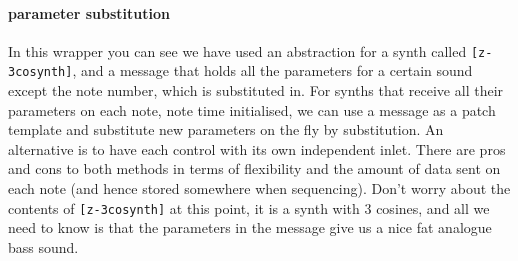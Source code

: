 \paragraph{parameter substitution}
In this wrapper you can see we have used an abstraction for a synth called
\verb+[z-3cosynth]+, and a message that holds all the parameters
for a certain sound except the note number, which is substituted in.
For synths that receive all their parameters on each note, note time
initialised, we can use a message as a patch template and 
substitute new parameters on the fly by substitution. An alternative is to
have each control with its own independent inlet. There are pros and cons 
to both methods in terms of flexibility and the amount of data sent
on each note (and hence stored somewhere when sequencing). Don't worry
about the contents of \verb+[z-3cosynth]+ at this point, it is a
synth with 3 cosines, and all we need to know is that the parameters
in the message give us a nice fat analogue bass sound.

